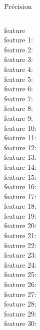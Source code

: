 \documentclass{bredelebeamer}
\begin{document}
\begin{frame}{Précision}

\begin{columns}

\begin{column}{0.2\textwidth}
\begin{tcolorbox}[tabgris,tabularx={|Y|}, boxrule=0.5pt, fontupper=\tiny, fontlower=\tiny]
feature\\
feature 1:\\
feature 2:\\
feature 3:\\
feature 4:\\
feature 5:\\
feature 6:\\
feature 7:\\
feature 8:\\
feature 9:\\
feature 10:\\
feature 11:\\
feature 12:\\
feature 13:\\
feature 14:\\
feature 15:\\
feature 16:\\
feature 17:\\
feature 18:\\
feature 19:\\
feature 20:\\
feature 21:\\
feature 22:\\
feature 23:\\
feature 24:\\
feature 25:\\
feature 26:\\
feature 27:\\
feature 28:\\
feature 29:\\
feature 30:\\
\end{tcolorbox}
\end{column}


\end{columns}
\end{frame}
\end{document}
